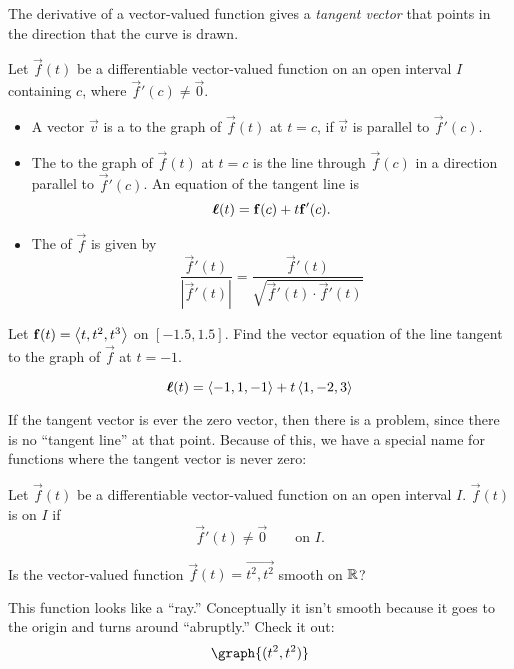 \documentclass{ximera}
\begin{document}
The derivative of a vector-valued function gives a \textit{tangent
  vector} that points in the direction that the curve is drawn.

\begin{definition}
Let $\vec{f}(t)$ be a differentiable vector-valued function on an open
interval $I$ containing $c$, where $\vec{f}'(c)\neq \vec{0}$.
\begin{itemize}
\item A vector $\vec v$ is a  to the graph of
  $\vec{f}(t)$ at $t=c$, if $\vec v$ is parallel to $\vec{f}'(c)$.
\item The  to the graph of $\vec f(t)$ at $t=c$
  is the line through $\vec f(c)$ in a direction parallel to
  $\vec{f}'(c)$. An equation of the tangent line is
  \[
  \boldsymbol{\ell}(t) = \mathbf f(c) + t\mathbf{f}'(c).
  \]
\item The  of $\vec{f}$ is given by
  \[
  \frac{\vec{f}'(t)}{|\vec{f}'(t)|} = \frac{\vec{f}'(t)}{\sqrt{\vec{f}'(t)\cdot \vec{f}'(t)}}
  \]
\end{itemize}
\end{definition}

\begin{question}
  Let $\mathbf{f}(t) = \left\langle t,t^2,t^3\right\rangle$ on $[-1.5,1.5]$.  Find the
  vector equation of the line tangent to the graph of $\vec f$ at
  $t=-1$.
  \begin{prompt}
    \[
    \boldsymbol{\ell}(t) = \left\langle -1,1,-1\right\rangle + t\left\langle 1,-2,3\right\rangle
    \]
  \end{prompt}
\end{question}

If the tangent vector is ever the zero vector, then there is a
problem, since there is no ``tangent line'' at that point. Because of
this, we have a special name for functions where the tangent vector is never zero:

\begin{definition}
Let $\vec{f}(t)$ be a differentiable vector-valued function on an open
interval $I$. $\vec f(t)$ is  on $I$ if
\[
\vec{f}'(t)\neq\vec{0}\qquad\text{on $I$.} 
\]
\end{definition}

\begin{question}
  Is the vector-valued function $\vec{f}(t) = \vec{t^2,t^2}$ smooth on
  $\mathbb R$?
  \begin{multipleChoice}
  \end{multipleChoice}
  \begin{feedback}
    This function looks like a ``ray.'' Conceptually it isn't smooth
    because it goes to the origin and turns around ``abruptly.'' Check it out:
    \[
    \graph{(t^2,t^2)}
    \]
  \end{feedback}
\end{question}
\end{document}

